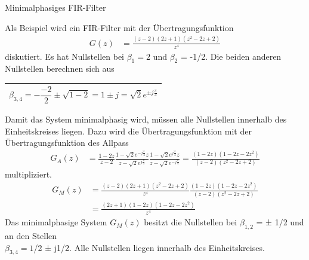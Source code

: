 \begin{example}{Minimalphasiges FIR-Filter}
\label{example:beispiel-minimalphasiges-fir-filter}

Als Beispiel wird ein FIR-Filter mit der Übertragungsfunktion
\begin{align*}
G(z) &= \frac{(z - 2)  (2  z + 1)  \left( z^{2} - 2  z + 2 \right)}{z^{4}} 
\end{align*}
diskutiert. Es hat Nullstellen bei \(β_{1} = 2\) und \(β_{2}\) = -1/2. Die beiden anderen Nullstellen berechnen sich aus

{\def\LTcaptype{none} %
\begin{center}
  \begin{tabular}{l}
    \toprule
    \noalign{}

\[\beta_{3,4} = - \frac{- 2}{2} \pm \sqrt{1 - 2} = 1 \pm j = \sqrt{2}  e^{\pm j  \frac{\pi}{4}}\] \\
    \bottomrule
  \end{tabular}
\end{center}
}

Damit das System minimalphasig wird, müssen alle Nullstellen innerhalb des Einheitskreises liegen. Dazu wird die Übertragungsfunktion mit der Übertragungsfunktion des Allpass
\begin{align*}
G_{A}(z) &= \frac{1 - 2  z}{z - 2}  \frac{1 - \sqrt{2}  e^{- j  \frac{\pi}{4}}  z}{z - \sqrt{2}  e^{j  \frac{\pi}{4}}}  \frac{1 - \sqrt{2}  e^{j  \frac{\pi}{4}}  z}{z - \sqrt{2}  e^{- j  \frac{\pi}{4}}} = \frac{(1 - 2  z)  \left( 1 - 2  z - 2  z^{2} \right)}{(z - 2)  \left( z^{2} - 2  z + 2 \right)} 
\end{align*}
multipliziert.
\begin{align*}
{G_{M} \left(z\right)} &=  {\frac{\left(z-2\right) \left(2 z+1\right) \left(z^{2} -2 z+2\right)}{z^{4} }  \frac{\left(1-2 z\right) \left(1-2 z-2 z^{2} \right)}{\left(z-2\right) \left(z^{2} -2 z+2\right)} } \\
{} &=  {\frac{\left(2 z+1\right) \left(1-2 z\right) \left(1-2 z-2 z^{2} \right)}{z^{4} } }
\end{align*}
Das minimalphasige System \(G_{M}(z)\) besitzt die Nullstellen bei \(β_{1,2}\) = ± 1/2 und an den Stellen\\
\(β_{3,4} = 1\)/2 ± j1/2. Alle Nullstellen liegen innerhalb des Einheitskreises.

\end{example}
